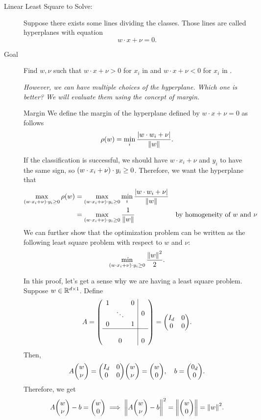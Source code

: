 \begin{description}
	\item [Linear Least Square to Solve:] Suppose there exists some lines dividing the classes. Those lines are called hyperplanes with equation \[w\cdot x+\nu=0.\]
	\item[Goal] Find $w,\nu$ such that $w\cdot x+\nu>0$ for $x_i$ in {\color{red}{red}} and $w\cdot x+\nu<0$ for $x_i$ in {\color{blue}{blue}}. \par 
	\textit{However, we can have multiple choices of the hyperplane. Which one is better? We will evaluate them using the concept of \emph{margin}.}
	\begin{df}{Margin}
		We define the margin of the hyperplane defined by $w\cdot x+\nu=0$ as follows \[\rho(w)=\min_i\dfrac{\abs{w\cdot w_i+\nu}}{\norm{w}}.\]
	\end{df}
	If the classification is successful, we should have $w\cdot x_i+\nu$ and $y_i$ to have the same sign, so $\qty(w\cdot x_i+\nu)\cdot y_i\geq0$. Therefore, we want the hyperplane that \begin{align*}\max_{\qty(w\cdot x_i+\nu)\cdot y_i\geq0}\rho(w)&=\max_{\qty(w\cdot x_i+\nu)\cdot y_i\geq0}\min_i\dfrac{\abs{w\cdot w_i+\nu}}{\norm{w}}\\&=\max_{\qty(w\cdot x_i+\nu)\cdot y_i\geq0}\dfrac{1}{\norm{w}}&\text{by homogeneity of }w\text{ and }\nu\end{align*}
	We can further show that the optimization problem can be written as the following least square problem with respect to $w$ and $\nu$: \begin{equation}\label{eq8}\min_{\qty(w\cdot x_i+\nu)\cdot y_i\geq0}\dfrac{\norm{w}^2}{2}.\end{equation}
	\begin{prf} 
		In this proof, let's get a sense why we are having a least square problem. Suppose $w\in{\mathbb{R}}^{d\times1}$. Define \[A=\left(\begin{array}{c|c}\mqty{1&&0\\&\ddots&\\0&&1}&0\\\hline\\0&0\end{array}\right)=\mqty(I_d&0\\0&0).\] Then, \[A\mqty(w\\\nu)=\mqty(I_d&0\\0&0)\mqty(w\\\nu)=\mqty(w\\0),\quad b=\mqty(0_d\\0).\] Therefore, we get \[A\mqty(w\\\nu)-b=\mqty(w\\0)\implies\norm{A\mqty(w\\\nu)-b}^2=\norm{\mqty(w\\0)}=\norm{w}^2.\]

\end{prf}
\end{description}
